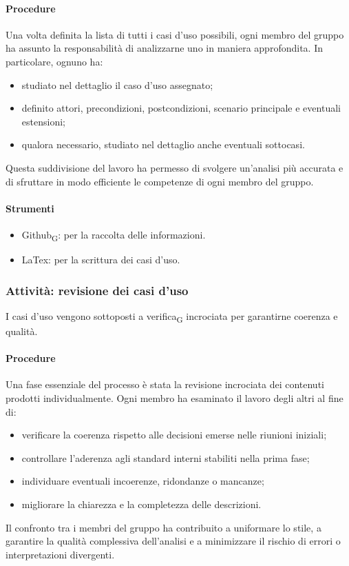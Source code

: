 \documentclass[11pt,a4paper]{article}
\newcommand{\gls}[1]{#1\textsubscript{G}}
\begin{document}
\paragraph{Procedure}
Una volta definita la lista di tutti i casi d’uso possibili, ogni membro del gruppo ha assunto la responsabilità di analizzarne uno in maniera approfondita. In particolare, ognuno ha:
\begin{itemize}
\item studiato nel dettaglio il caso d’uso assegnato;
\item definito attori, precondizioni, postcondizioni, scenario principale e eventuali estensioni;
\item qualora necessario, studiato nel dettaglio anche eventuali sottocasi.
\end{itemize}
Questa suddivisione del lavoro ha permesso di svolgere un’analisi più accurata e di sfruttare in modo efficiente le competenze di ogni membro del gruppo.

\paragraph{Strumenti}
\begin{itemize}
\item \gls{Github}: per la raccolta delle informazioni.
\item LaTex: per la scrittura dei casi d'uso.
\end{itemize}

\subsubsection{Attività: revisione dei casi d'uso}
I casi d’uso vengono sottoposti a \gls{verifica} incrociata per garantirne coerenza e qualità.

\paragraph{Procedure}
Una fase essenziale del processo è stata la revisione incrociata dei contenuti prodotti individualmente.
Ogni membro ha esaminato il lavoro degli altri al fine di:
\begin{itemize}
\item verificare la coerenza rispetto alle decisioni emerse nelle riunioni iniziali;
\item controllare l’aderenza agli standard interni stabiliti nella prima fase;
\item individuare eventuali incoerenze, ridondanze o mancanze;
\item migliorare la chiarezza e la completezza delle descrizioni.
\end{itemize}
Il confronto tra i membri del gruppo ha contribuito a uniformare lo stile, a garantire la qualità complessiva dell’analisi e a minimizzare il rischio di errori o interpretazioni divergenti.
\end{document}
